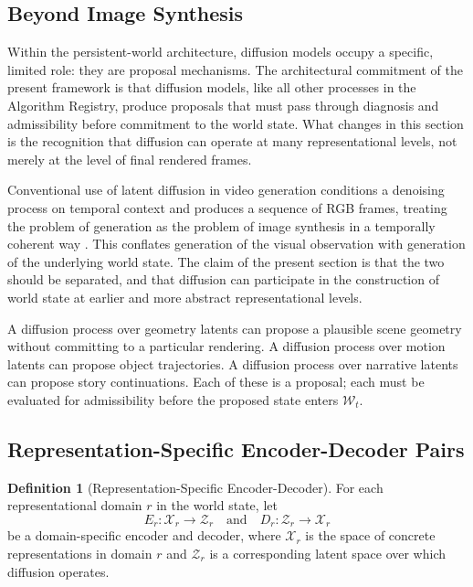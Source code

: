 \documentclass[11pt,a4paper]{article}
\theoremstyle{plain}
\theoremstyle{definition}
\newtheorem{definition}[theorem]{Definition}
\theoremstyle{remark}
\begin{document}
\subsection{Beyond Image Synthesis}

Within the persistent-world architecture, diffusion models \cite{sohl2015,ho2020ddpm,song2021score} occupy a specific, limited role: they are proposal mechanisms. The architectural commitment of the present framework is that diffusion models, like all other processes in the Algorithm Registry, produce proposals that must pass through diagnosis and admissibility before commitment to the world state. What changes in this section is the recognition that diffusion can operate at many representational levels, not merely at the level of final rendered frames.

Conventional use of latent diffusion in video generation conditions a denoising process on temporal context and produces a sequence of RGB frames, treating the problem of generation as the problem of image synthesis in a temporally coherent way \cite{ho2022videodiffusion,rombach2022ldm}. This conflates generation of the visual observation with generation of the underlying world state. The claim of the present section is that the two should be separated, and that diffusion can participate in the construction of world state at earlier and more abstract representational levels.

A diffusion process over geometry latents can propose a plausible scene geometry without committing to a particular rendering. A diffusion process over motion latents can propose object trajectories. A diffusion process over narrative latents can propose story continuations. Each of these is a proposal; each must be evaluated for admissibility before the proposed state enters $\mathcal{W}_t$.

\subsection{Representation-Specific Encoder-Decoder Pairs}

\begin{definition}[Representation-Specific Encoder-Decoder]
For each representational domain $r$ in the world state, let
\[
E_r : \mathcal{X}_r \to \mathcal{Z}_r \quad \text{and} \quad D_r : \mathcal{Z}_r \to \mathcal{X}_r
\]
be a domain-specific encoder and decoder, where $\mathcal{X}_r$ is the space of concrete representations in domain $r$ and $\mathcal{Z}_r$ is a corresponding latent space over which diffusion operates.
\end{definition}
\end{document}
